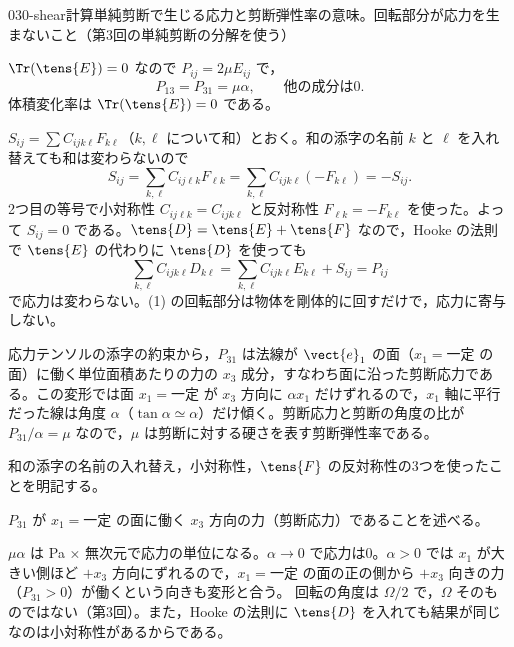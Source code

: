\documentclass[uplatex,dvipdfmx,a4paper,11pt]{jsarticle}
\begin{document}
\begin{mondai}{030-shear}{計算}{単純剪断で生じる応力と剪断弾性率の意味。回転部分が応力を生まないこと（第3回の単純剪断の分解を使う）}
\begin{tadashii}
 $\Tr(\tens{E})=0$ なので $P_{ij}=2\mu E_{ij}$ で，
\[ P_{13}=P_{31}=\mu\alpha,\qquad \text{他の成分は0}. \]
体積変化率は $\Tr(\tens{E})=0$ である。

 $S_{ij}=\sum C_{ijk\ell}F_{k\ell}$（$k,\ell$ について和）とおく。和の添字の名前 $k$ と $\ell$ を入れ替えても和は変わらないので
\[ S_{ij}=\sum_{k,\ell}C_{ij\ell k}F_{\ell k}=\sum_{k,\ell}C_{ijk\ell}\left(-F_{k\ell}\right)=-S_{ij}. \]
2つ目の等号で小対称性 $C_{ij\ell k}=C_{ijk\ell}$ と反対称性 $F_{\ell k}=-F_{k\ell}$ を使った。よって $S_{ij}=0$ である。$\tens{D}=\tens{E}+\tens{F}$ なので，Hooke の法則で $\tens{E}$ の代わりに $\tens{D}$ を使っても
\[ \sum_{k,\ell}C_{ijk\ell}D_{k\ell}=\sum_{k,\ell}C_{ijk\ell}E_{k\ell}+S_{ij}=P_{ij} \]
で応力は変わらない。(1) の回転部分は物体を剛体的に回すだけで，応力に寄与しない。

 応力テンソルの添字の約束から，$P_{31}$ は法線が $\vect{e}_1$ の面（$x_1=\text{一定}$ の面）に働く単位面積あたりの力の $x_3$ 成分，すなわち面に沿った剪断応力である。この変形では面 $x_1=\text{一定}$ が $x_3$ 方向に $\alpha x_1$ だけずれるので，$x_1$ 軸に平行だった線は角度 $\alpha$（$\tan\alpha\simeq\alpha$）だけ傾く。剪断応力と剪断の角度の比が $P_{31}/\alpha=\mu$ なので，$\mu$ は剪断に対する硬さを表す剪断弾性率である。
\begin{ronten}
  \item {} 和の添字の名前の入れ替え，小対称性，$\tens{F}$ の反対称性の3つを使ったことを明記する。
  \item {} $P_{31}$ が $x_1=\text{一定}$ の面に働く $x_3$ 方向の力（剪断応力）であることを述べる。
\end{ronten}
\kenzan $\mu\alpha$ は \unit{\pascal} × 無次元で応力の単位になる。$\alpha\to0$ で応力は0。$\alpha>0$ では $x_1$ が大きい側ほど $+x_3$ 方向にずれるので，$x_1=\text{一定}$ の面の正の側から $+x_3$ 向きの力（$P_{31}>0$）が働くという向きも変形と合う。
\tsumazuki 回転の角度は $\Omega/2$ で，$\Omega$ そのものではない（第3回）。また，Hooke の法則に $\tens{D}$ を入れても結果が同じなのは小対称性があるからである。
\end{tadashii}
\end{mondai}

\noteowari
\end{document}
